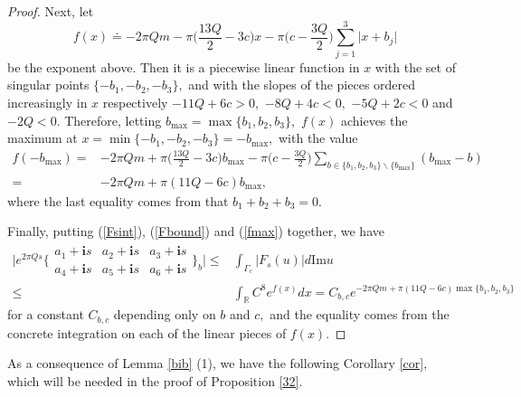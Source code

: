 \documentclass[11pt]{article}
\renewcommand{\setminus}{{\smallsetminus}}
\theoremstyle{remark}
\theoremstyle{remark}
\numberwithin{equation}{section}
\begin{document}
\begin{proof}
Next, let
$$f(x)\doteq -2\pi Qm-\pi\bigg(\frac{13Q}{2}-3c\bigg)x -\pi\bigg(c-\frac{3Q}{2}\bigg)\sum_{j=1}^3\big|x+b_j\big|$$
be the exponent above. 
Then it is a piecewise linear function in $x$ with the set of  singular points $\{-b_1,-b_2,-b_3\},$ and with the slopes of the pieces ordered increasingly in $x$ respectively $-11Q+6c>0,$ $-8Q+4c<0,$ $-5Q+2c<0$ and $-2Q<0.$ Therefore, letting $b_\text{max}=\max\{b_1,b_2,b_3\},$ $f(x)$ achieves the maximum  at $x=\min\{-b_1,-b_2,-b_3\}=-b_\text{max},$  with the value
\begin{equation}\label{fmax}
\begin{split}
    f(-b_\text{max})=&-2\pi Qm+\pi\bigg(\frac{13Q}{2}-3c\bigg)b_\text{max} -\pi\bigg(c-\frac{3Q}{2}\bigg)\sum_{b\in \{b_1,b_2,b_3\}\setminus\{b_\text{max}\}}(b_\text{max}-b)\\
    = & -2\pi Q m + \pi (11Q-6c) b_\text{max},
\end{split}
\end{equation}
where the last equality comes from that $b_1+b_2+b_3 =0.$

Finally, putting (\ref{Fsint}), (\ref{Fbound}) and (\ref{fmax}) together, we have 
\begin{equation*}
\begin{split}
  \Bigg|e^{2\pi Q s} \bigg\{\begin{matrix} a_1+\mathbf is & a_2 +\mathbf is & a_3+\mathbf is  \\ a_4+\mathbf is & a_5+\mathbf is & a_6+\mathbf is \end{matrix} \bigg\}_b\Bigg| \leqslant & \int_{\Gamma_c} |F_s(u)|d\mathrm{Im}u\\
\leqslant  & \int_{\mathbb R} C^8 e^{f(x)}dx =C_{b,c} e^{-2\pi Qm + \pi (11Q-6c)\max\{b_1,b_2,b_3\}}
\end{split}    
\end{equation*}
for a constant  $C_{b,c}$  depending only on $b$ and $c,$ and the equality comes from  the concrete integration  on each of the linear pieces of $f(x).$
\end{proof}


As a consequence of Lemma \ref{bib} (1), we have the following Corollary \ref{cor}, which will be needed in the proof of Proposition \ref{32}.
\end{document}
